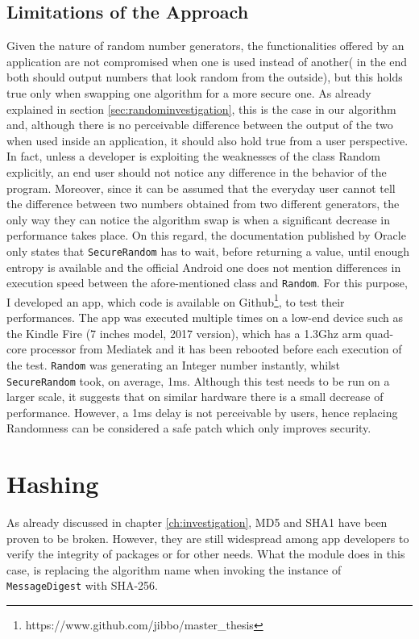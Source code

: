 \subsection{Limitations of the Approach}
Given the nature of random number generators, the functionalities offered by an application are not compromised when one is used instead of another\newline ( in the end both should output numbers that look random from the outside), but this holds true only when swapping one algorithm for a more secure one. As already explained in section \ref{sec:randominvestigation}, this is the case in our algorithm and, although there is no perceivable difference between the output of the two when used inside an application, it should also hold true from a user perspective. In fact, unless a developer is exploiting the weaknesses of the class Random explicitly, an end user should not notice any difference in the behavior of the program. Moreover, since it can be assumed that the everyday user cannot tell the difference between two numbers obtained from two different generators, the only way they can notice the algorithm swap is when a significant decrease in performance takes place. On this regard, the documentation published by Oracle only states that \texttt{SecureRandom} has to wait, before returning a value, until enough entropy is available and the official Android one does not mention differences in execution speed between the afore-mentioned class and \texttt{Random}. For this purpose, I developed an app, which code is available on Github\footnote{https://www.github.com/jibbo/master\_thesis}, to test their performances. The app was executed multiple times on a low-end device such as the Kindle Fire (7 inches model, 2017 version), which has a 1.3Ghz arm quad-core processor from Mediatek and it has been rebooted before each execution of the test. \texttt{Random} was generating an Integer number instantly, whilst \texttt{SecureRandom} took, on average, 1ms. Although this test needs to be run on a larger scale, it suggests that on similar hardware there is a small decrease of performance. However, a 1ms delay is not perceivable by users, hence replacing Randomness can be considered a safe patch which only improves security.

\section{Hashing}
As already discussed in chapter \ref{ch:investigation}, MD5 and SHA1 have been proven to be broken. However, they are still widespread among app developers to verify the integrity of packages or for other needs. What the module does in this case, is replacing the algorithm name when invoking the instance of \texttt{MessageDigest} with SHA-256.

